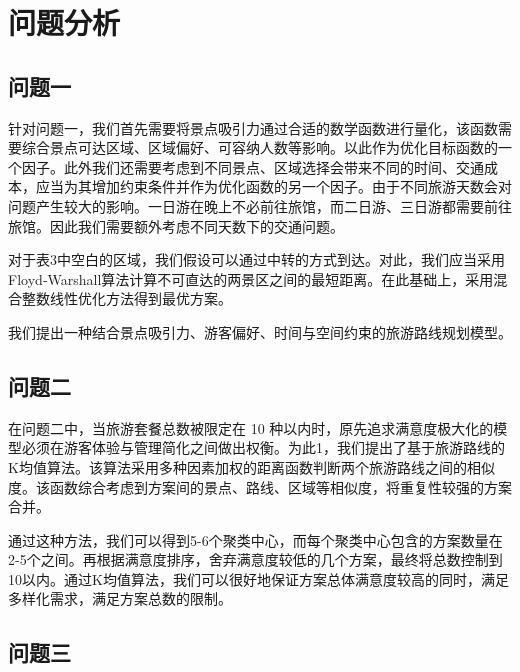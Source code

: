 \chapter[\hspace{0pt}问题分析]{{\heiti{}\hspace{0pt}问题分析}}\label{chapter1: 问题分析}
\removelofgap
\removelotgap

\section[\hspace{-2pt}问题一]{{\heiti{} \hspace{-8pt}问题一}}\label{section1: 问题一}

针对问题一，我们首先需要将景点吸引力通过合适的数学函数进行量化，该函数需要综合景点可达区域、区域偏好、可容纳人数等影响。以此作为优化目标函数的一个因子。此外我们还需要考虑到不同景点、区域选择会带来不同的时间、交通成本，应当为其增加约束条件并作为优化函数的另一个因子。由于不同旅游天数会对问题产生较大的影响。一日游在晚上不必前往旅馆，而二日游、三日游都需要前往旅馆。因此我们需要额外考虑不同天数下的交通问题。

对于表3中空白的区域，我们假设可以通过中转的方式到达。对此，我们应当采用Floyd‑Warshall算法计算不可直达的两景区之间的最短距离。在此基础上，采用混合整数线性优化方法得到最优方案。

我们提出一种结合景点吸引力、游客偏好、时间与空间约束的旅游路线规划模型。

\section[\hspace{-2pt}问题二]{{\heiti{} \hspace{-8pt}问题二}}\label{section1: 问题二}

在问题二中，当旅游套餐总数被限定在 10 种以内时，原先追求满意度极大化的模型必须在游客体验与管理简化之间做出权衡。为此1，我们提出了基于旅游路线的K均值算法。该算法采用多种因素加权的距离函数判断两个旅游路线之间的相似度。该函数综合考虑到方案间的景点、路线、区域等相似度，将重复性较强的方案合并。

通过这种方法，我们可以得到5-6个聚类中心，而每个聚类中心包含的方案数量在2-5个之间。再根据满意度排序，舍弃满意度较低的几个方案，最终将总数控制到10以内。通过K均值算法，我们可以很好地保证方案总体满意度较高的同时，满足多样化需求，满足方案总数的限制。

\section[\hspace{-2pt}问题三]{{\heiti{} \hspace{-8pt}问题三}}\label{section1: 问题三}

